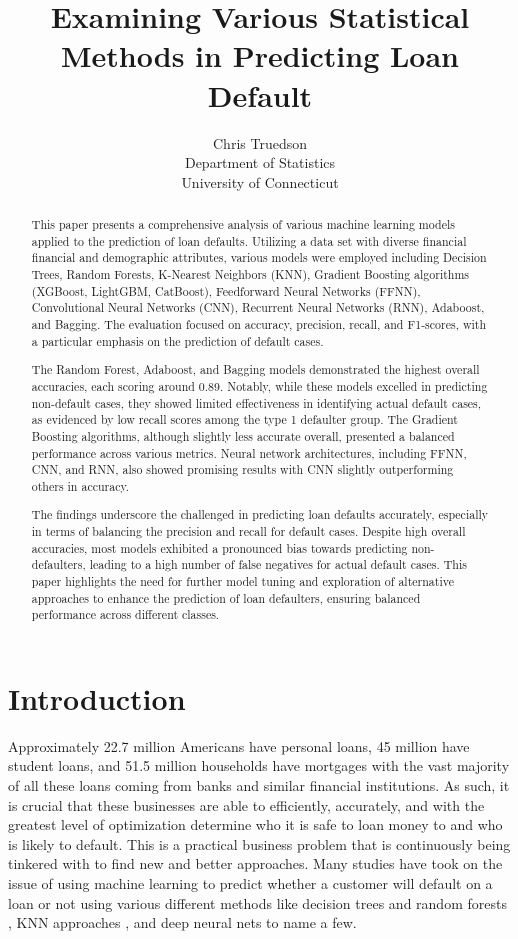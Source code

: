 \documentclass[12pt]{article}
\title{Examining Various Statistical Methods in Predicting Loan Default}
\author{Chris Truedson\\
  Department of Statistics\\
  University of Connecticut
}
\begin{document}
\maketitle

\begin{abstract}
This paper presents a comprehensive analysis of various machine learning models applied to the prediction of loan defaults. Utilizing a data set with diverse financial financial and demographic attributes, various models were employed including Decision Trees, Random Forests, K-Nearest Neighbors (KNN), Gradient Boosting algorithms (XGBoost, LightGBM, CatBoost), Feedforward Neural Networks (FFNN), Convolutional Neural Networks (CNN), Recurrent Neural Networks (RNN), Adaboost, and Bagging. The evaluation focused on accuracy, precision, recall, and F1-scores, with a particular emphasis on the prediction of default cases.

The Random Forest, Adaboost, and Bagging models demonstrated the highest overall accuracies, each scoring around 0.89. Notably, while these models excelled in predicting non-default cases, they showed limited effectiveness in identifying actual default cases, as evidenced by low recall scores among the type 1 defaulter group. The Gradient Boosting algorithms, although slightly less accurate overall, presented a balanced performance across various metrics. Neural network architectures, including FFNN, CNN, and RNN, also showed promising results with CNN slightly outperforming others in accuracy.

The findings underscore the challenged in predicting loan defaults accurately, especially in terms of balancing the precision and recall for default cases. Despite high overall accuracies, most models exhibited a pronounced bias towards predicting non-defaulters, leading to a high number of false negatives for actual default cases. This paper highlights the need for further model tuning and exploration of alternative approaches to enhance the prediction of loan defaulters, ensuring balanced performance across different classes.
\end{abstract}


\section{Introduction}
\label{sec:intro}

Approximately 22.7 million Americans have personal loans, 45 million have student loans, and 51.5 million households have mortgages with the vast majority of all these loans coming from banks and similar financial institutions. As such, it is crucial that these businesses are able to efficiently, accurately, and with the greatest level of optimization determine who it is safe to loan money to and who is likely to default. This is a practical business problem that is continuously being tinkered with to find new and better approaches. Many studies have took on the issue of using machine learning to predict whether a customer will default on a loan or not using various different methods like decision trees and random forests \citet{madaan2021loan}, KNN approaches \citet{lai2020loan}, and deep neural nets \citet{bayraci2019deep} to name a few.
\end{document}
